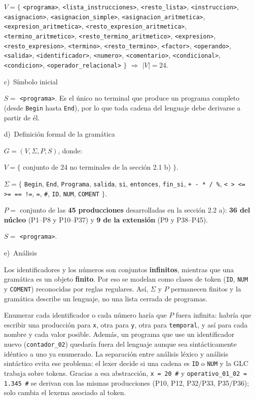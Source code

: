 \documentclass[11pt,letterpaper]{article}
\newcommand{\letra}[2]{\par\medskip\noindent #1)~#2\par\smallskip}
\begin{document}
\begin{center}
$V = \{$ \lstinline|<programa>|, \lstinline|<lista_instrucciones>|, \lstinline|<resto_lista>|,
\lstinline|<instruccion>|, \lstinline|<asignacion>|, \lstinline|<asignacion_simple>|,
\lstinline|<asignacion_aritmetica>|, \lstinline|<expresion_aritmetica>|,
\lstinline|<resto_expresion_aritmetica>|, \lstinline|<termino_aritmetico>|,
\lstinline|<resto_termino_aritmetico>|, \lstinline|<expresion>|, \lstinline|<resto_expresion>|,
\lstinline|<termino>|, \lstinline|<resto_termino>|, \lstinline|<factor>|, \lstinline|<operando>|,
\lstinline|<salida>|, \lstinline|<identificador>|, \lstinline|<numero>|, \lstinline|<comentario>|,
\lstinline|<condicional>|, \lstinline|<condicion>|, \lstinline|<operador_relacional>| $\}$
\quad $\Rightarrow$ \quad $|V| = 24$.
\end{center}

\letra{c}{Símbolo inicial}

$S =$ \lstinline|<programa>|. Es el único no terminal que produce un programa completo (desde
\lstinline|Begin| hasta \lstinline|End|), por lo que toda cadena del lenguaje debe derivarse a partir de él.

\letra{d}{Definición formal de la gramática}

$G = (V, \Sigma, P, S)$, donde:

$V = \{$ conjunto de 24 no terminales de la sección 2.1 b) $\}$.

$\Sigma = \{$ \lstinline|Begin|, \lstinline|End|, \lstinline|Programa|, \lstinline|salida|,
\lstinline|si|, \lstinline|entonces|, \lstinline|fin_si|, \lstinline|+ - * / %|,
\lstinline|< > <= >= == !=|, \lstinline|=|, \lstinline|#|, \lstinline|ID|, \lstinline|NUM|,
\lstinline|COMENT| $\}$.

$P =$ conjunto de las \textbf{45 producciones} desarrolladas en la sección 2.2 a): \textbf{36 del núcleo}
(P1--P8 y P10--P37) y \textbf{9 de la extensión} (P9 y P38--P45).

$S =$ \lstinline|<programa>|.

\letra{e}{Análisis}

Los identificadores y los números son conjuntos \textbf{infinitos}, mientras que una gramática es un objeto
\textbf{finito}. Por eso se modelan como clases de token (\lstinline|ID|, \lstinline|NUM| y
\lstinline|COMENT|) reconocidas por reglas regulares. Así, $\Sigma$ y $P$ permanecen finitos y la gramática
describe un lenguaje, no una lista cerrada de programas.

Enumerar cada identificador o cada número haría que $P$ fuera infinita: habría que escribir una producción
para \lstinline|x|, otra para \lstinline|y|, otra para \lstinline|temporal|, y así para cada nombre y cada
valor posible. Además, un programa que use un identificador nuevo (\lstinline|contador_02|) quedaría fuera del
lenguaje aunque sea sintácticamente idéntico a uno ya enumerado. La separación entre análisis léxico y
análisis sintáctico evita ese problema: el lexer decide si una cadena es \lstinline|ID| o \lstinline|NUM| y
la GLC trabaja sobre tokens. Gracias a esa abstracción, \lstinline|x = 20 #| y
\lstinline|operativo_01_02 = 1.345 #| se derivan con las mismas producciones (P10, P12, P32/P33, P35/P36);
solo cambia el lexema asociado al token.
\end{document}
